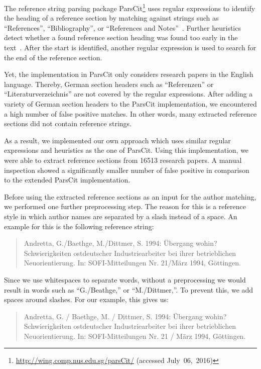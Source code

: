 The reference string parsing package ParsCit\footnote{\url{http://wing.comp.nus.edu.sg/parsCit/} (accessed July~06,~2016)} uses regular expressions to identify the heading of a reference section by matching against strings such as ``References'', ``Bibliography'', or ``References and Notes''~\citep{councill2008parscit}.
Further heuristics detect whether a found reference section heading was found too early in the text~\citep{councill2008parscit}.
After the start is identified, another regular expression is used to search for the end of the reference section.

Yet, the implementation in ParsCit only considers research papers in the English language.
Thereby, German section headers such as ``Referenzen'' or ``Literaturverzeichnis'' are not covered by the regular expressions.
After adding a variety of German section headers to the ParsCit implementation, we encountered a high number of false positive matches.
In other words, many extracted reference sections did not contain reference strings.

As a result, we implemented our own approach which uses similar regular expressions and heuristics as the one of ParsCit.
Using this implementation, we were able to extract reference sections from \num{16513} research papers.
A manual inspection showed a significantly smaller number of false positive in comparison to the extended ParsCit implementation.

\bigskip

Before using the extracted reference sections as an input for the author matching, we performed one further preprocessing step.
The reason for this is a reference style in which author names are separated by a slash instead of a space.
An example for this is the following reference string:
\begin{quote}
  Andretta, G./Baethge, M./Dittmer, S. 1994: Übergang wohin? Schwierigkeiten ostdeutscher Industriearbeiter bei ihrer betrieblichen Neuorientierung. In: SOFI-Mitteilungen Nr. 21/März 1994, Göttingen.
\end{quote}
Since we use whitespaces to separate words, without a preprocessing we would result in words such as ``G./Beathge,{}'' or ``M./Dittmer,{}''.
To prevent this, we add spaces around slashes.
For our example, this gives us:
\begin{quote}
  Andretta, G. / Baethge, M. / Dittmer, S. 1994: Übergang wohin? Schwierigkeiten ostdeutscher Industriearbeiter bei ihrer betrieblichen Neuorientierung. In: SOFI-Mitteilungen Nr. 21 / März 1994, Göttingen.
\end{quote}

